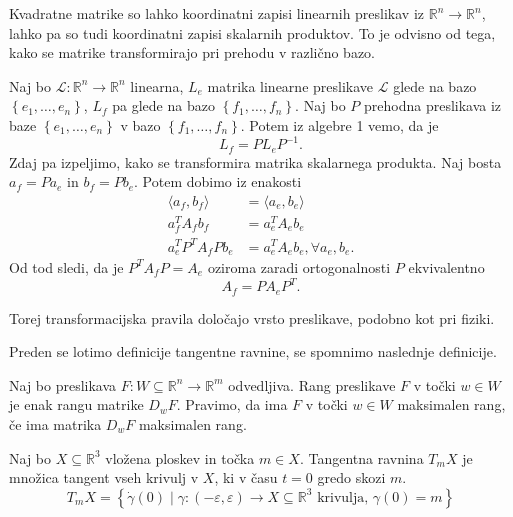 \begin{opomba}
Kvadratne matrike so lahko koordinatni
zapisi linearnih preslikav iz $\mathbb{R}^n \to
\mathbb{R}^n$, lahko pa so tudi koordinatni zapisi
skalarnih produktov. To je odvisno od tega, kako se
matrike transformirajo pri prehodu v različno bazo.

Naj bo $\mathcal{L}: \mathbb{R}^n \to  \mathbb{R}^n$ linearna, $L_e$ matrika
linearne preslikave $\mathcal{L}$ glede na bazo $\left\{ e_1, \ldots
, e_{n}\right\}$, $L_f$ pa glede na bazo $\left\{ f_1,
\ldots, f_{n}\right\}.$ Naj bo $P$ prehodna preslikava
iz baze $\left\{ e_1, \ldots
, e_{n}\right\}$ v bazo $\left\{ f_1, \ldots
, f_{n}\right\}$. Potem iz algebre 1 vemo, da je \begin{equation*}
L_f = PL_eP^{-1}. \end{equation*}Zdaj pa izpeljimo, kako se
transformira matrika skalarnega produkta. Naj bosta
$a_f = Pa_e$ in $b_f = Pb_e$. Potem dobimo iz enakosti
\begin{align*} \langle a_f, b_f \rangle &= \langle
a_e, b_e \rangle \\ a_f^{T} A_f b_f &= a_e^{T} A_e
b_e \\ a_e^{T} P^{T} A_f P b_e &= a_e^{T} A_e b_e,
\forall a_e, b_e. \end{align*} Od tod sledi, da je
$P^{T}A_fP = A_e$ oziroma zaradi ortogonalnosti
$P$ ekvivalentno \begin{equation*}A_f = PA_eP^{T}.\end{equation*}

Torej transformacijska pravila določajo vrsto
preslikave, podobno kot pri fiziki. 
\end{opomba}

Preden se lotimo definicije tangentne ravnine, se spomnimo naslednje
definicije. 

\begin{definicija}
\label{def_rang_preslikave}
 Naj bo preslikava $F: W \subseteq  \mathbb{R}^n \to  \mathbb{R}^m$ odvedljiva.
 Rang preslikave $F$ v točki $w \in  W$ je enak rangu matrike $D_wF$. Pravimo,
 da ima $F$ v točki $w \in  W$ maksimalen rang, če ima matrika $D_wF$
 maksimalen rang.
\end{definicija}


\begin{definicija} 
	\label{def_tangentna_ravnina}
	Naj bo $X \subseteq \mathbb{R}^3$ vložena ploskev in točka $m
\in X$. Tangentna ravnina $T_mX$ je množica tangent
vseh krivulj v $X$, ki v času $t = 0$ gredo skozi $m$.
\begin{equation*} T_mX = \left\{ \dot{\gamma}\left( 0 \right) \mid
\gamma : \left(  - \varepsilon, \varepsilon \right)
\to  X \subseteq  \mathbb{R}^3 \text{ krivulja, } \gamma\left(
0 \right) = m\right\} \end{equation*}
\end{definicija}



